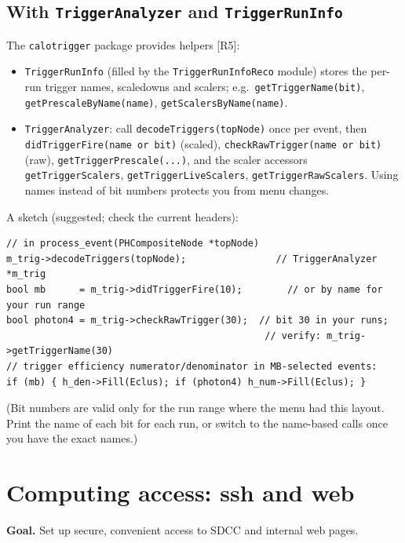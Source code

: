 \documentclass[11pt,letterpaper]{article}
\newcommand{\goal}[1]{\par\noindent\textbf{Goal.} #1\par\smallskip}
\newcommand{\code}[1]{\texttt{#1}}
\begin{document}
\subsection{With \code{TriggerAnalyzer} and \code{TriggerRunInfo}}
The \code{calotrigger} package provides helpers [R5]:
\begin{itemize}
\item \code{TriggerRunInfo} (filled by the \code{TriggerRunInfoReco} module) stores the per-run trigger names, scaledowns and scalers; e.g.\ \code{getTriggerName(bit)}, \code{getPrescaleByName(name)}, \code{getScalersByName(name)}.
\item \code{TriggerAnalyzer}: call \code{decodeTriggers(topNode)} once per event, then \code{didTriggerFire(name or bit)} (scaled), \code{checkRawTrigger(name or bit)} (raw), \code{getTriggerPrescale(...)}, and the scaler accessors \code{getTriggerScalers}, \code{getTriggerLiveScalers}, \code{getTriggerRawScalers}. Using names instead of bit numbers protects you from menu changes.
\end{itemize}
A sketch (suggested; check the current headers):
{\footnotesize\begin{verbatim}
// in process_event(PHCompositeNode *topNode)
m_trig->decodeTriggers(topNode);                // TriggerAnalyzer *m_trig
bool mb      = m_trig->didTriggerFire(10);        // or by name for your run range
bool photon4 = m_trig->checkRawTrigger(30);  // bit 30 in your runs;
                                              // verify: m_trig->getTriggerName(30)
// trigger efficiency numerator/denominator in MB-selected events:
if (mb) { h_den->Fill(Eclus); if (photon4) h_num->Fill(Eclus); }
\end{verbatim}}
(Bit numbers are valid only for the run range where the menu had this layout. Print the name of each bit for each run, or switch to the name-based calls once you have the exact names.)

\section{Computing access: ssh and web}\label{sec:ssh}
\goal{Set up secure, convenient access to SDCC and internal web pages.}
\end{document}
